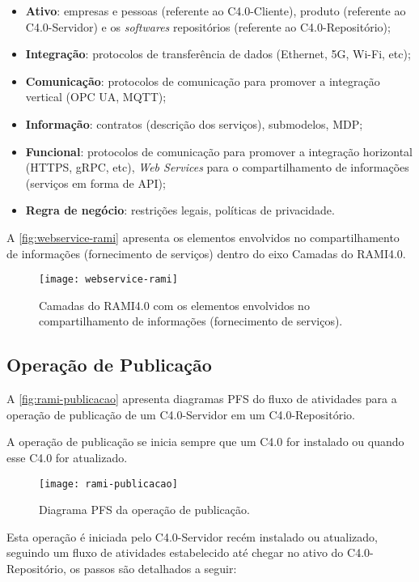 \begin{itemize}
	\item \textbf{Ativo}: empresas e pessoas (referente ao C4.0-Cliente), produto (referente ao C4.0-Servidor) e os \textit{softwares} repositórios (referente ao C4.0-Repositório);
	\item \textbf{Integração}: protocolos de transferência de dados (Ethernet, 5G, Wi-Fi, etc);
	\item \textbf{Comunicação}: protocolos de comunicação para promover a integração vertical (OPC UA, MQTT);
	\item \textbf{Informação}: contratos (descrição dos serviços), submodelos, MDP;
	\item \textbf{Funcional}: protocolos de comunicação para promover a integração horizontal (HTTPS, gRPC, etc), \textit{Web Services} para o compartilhamento de informações (serviços em forma de API);
	\item \textbf{Regra de negócio}: restrições legais, políticas de privacidade.
\end{itemize}

A \autoref{fig:webservice-rami} apresenta os elementos envolvidos no compartilhamento de informações (fornecimento de serviços) dentro do eixo Camadas do RAMI4.0.

\begin{figure}[H]
	\centering
	\texttt{[image: webservice-rami]}
	\caption{Camadas do RAMI4.0 com os elementos envolvidos no compartilhamento de informações (fornecimento de serviços).}
	\label{fig:webservice-rami}
\end{figure}

\subsection{Operação de Publicação}

A \autoref{fig:rami-publicacao} apresenta diagramas PFS do fluxo de atividades para a operação de publicação de um C4.0-Servidor em um C4.0-Repositório.

A operação de publicação se inicia sempre que um C4.0 for instalado ou quando esse C4.0 for atualizado.

\begin{figure}[htb]
	\centering
	\texttt{[image: rami-publicacao]}
	\caption{Diagrama PFS da operação de publicação.}
	\label{fig:rami-publicacao}
\end{figure}

Esta operação é iniciada pelo C4.0-Servidor recém instalado ou atualizado, seguindo um fluxo de atividades estabelecido até chegar no ativo do C4.0-Repositório, os passos são detalhados a seguir:

